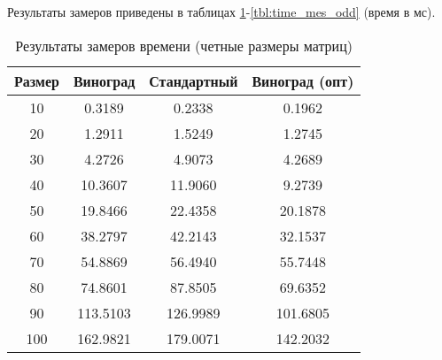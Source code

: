 Результаты замеров приведены в таблицах \ref{tbl:time_mes_even}-\ref{tbl:time_mes_odd} (время в мс).

\begin{table}[h]
    \begin{center}
        \begin{threeparttable}
        \captionsetup{justification=raggedright,singlelinecheck=off}
        \caption{Результаты замеров времени (четные размеры матриц)}
        \label{tbl:time_mes_even}
        \begin{tabular}{|c|c|c|c|}
            \hline
            Размер & Виноград & Стандартный & Виноград (опт) \\
            \hline
            10 & 0.3189 & 0.2338 & 0.1962 \\
            \hline
            20 & 1.2911 & 1.5249 & 1.2745 \\
            \hline
            30 & 4.2726 & 4.9073 & 4.2689 \\
            \hline
            40 & 10.3607 & 11.9060 & 9.2739 \\
            \hline
            50 & 19.8466 & 22.4358 & 20.1878 \\
            \hline
            60 & 38.2797 & 42.2143 & 32.1537 \\
            \hline
            70 & 54.8869 & 56.4940 & 55.7448 \\
            \hline
            80 & 74.8601 & 87.8505 & 69.6352 \\
            \hline
            90 & 113.5103 & 126.9989 & 101.6805 \\
            \hline
            100 & 162.9821 & 179.0071 & 142.2032 \\
            \hline
		\end{tabular}
    \end{threeparttable}
\end{center}
\end{table}

\clearpage


